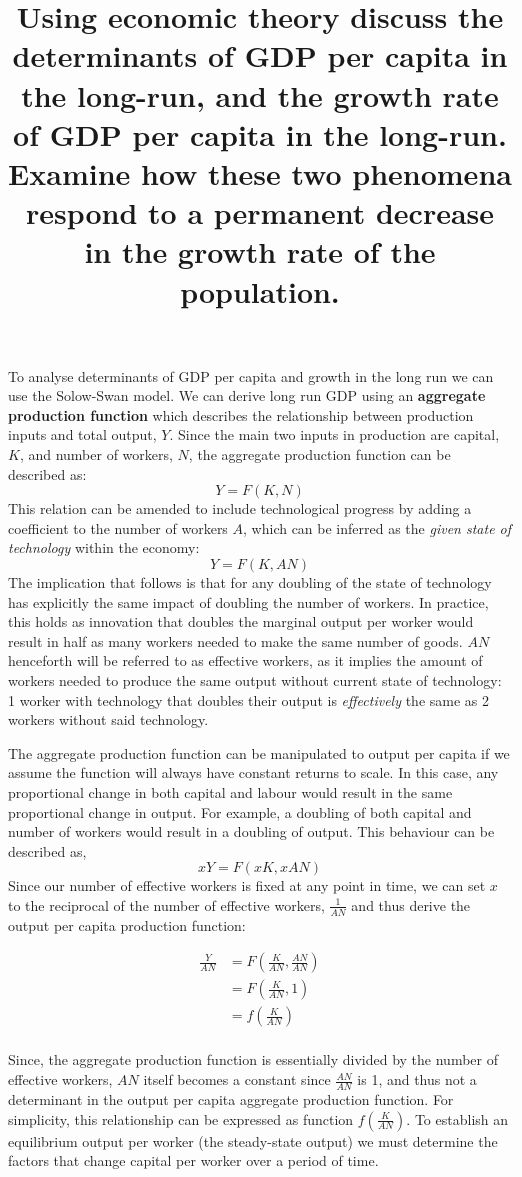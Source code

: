\documentclass[
]{article}
\title{Using economic theory discuss the determinants of GDP per capita
in the long-run, and the growth rate of GDP per capita in the long-run.
Examine how these two phenomena respond to a permanent decrease in the
growth rate of the population.}
\author{}
\date{}
\begin{document}
\maketitle

To analyse determinants of GDP per capita and growth in the long run we
can use the Solow-Swan model. We can derive long run GDP using an
\textbf{aggregate production function} which describes the relationship
between production inputs and total output, {\(Y\)}. Since the main two
inputs in production are capital, {\(K\)}, and number of workers,
{\(N\)}, the aggregate production function can be described as:
{\[Y = F(K,N)\]}This relation can be amended to include technological
progress by adding a coefficient to the number of workers {\(A\)}, which
can be inferred as the \emph{given state of technology} within the
economy: {\[Y = F(K,AN)\]}The implication that follows is that for any
doubling of the state of technology has explicitly the same impact of
doubling the number of workers. In practice, this holds as innovation
that doubles the marginal output per worker would result in half as many
workers needed to make the same number of goods. {\(AN\)} henceforth
will be referred to as effective workers, as it implies the amount of
workers needed to produce the same output without current state of
technology: 1 worker with technology that doubles their output is
\emph{effectively} the same as 2 workers without said technology.

The aggregate production function can be manipulated to output per
capita if we assume the function will always have constant returns to
scale. In this case, any proportional change in both capital and labour
would result in the same proportional change in output. For example, a
doubling of both capital and number of workers would result in a
doubling of output. This behaviour can be described as,
{\[xY = F(xK,xAN)\]}Since our number of effective workers is fixed at
any point in time, we can set {\(x\)} to the reciprocal of the number of
effective workers, {\(\frac{1}{AN}\)} and thus derive the output per
capita production function:

\[\begin{matrix}
\frac{Y}{AN} & {= F\left( \frac{K}{AN},\frac{AN}{AN} \right)} \\
 & {= F\left( \frac{K}{AN},1 \right)} \\
 & {= f\left( \frac{K}{AN} \right)} \\
\end{matrix}\]

Since, the aggregate production function is essentially divided by the
number of effective workers, {\(AN\)} itself becomes a constant since
{\(\frac{AN}{AN}\)} is 1, and thus not a determinant in the output per
capita aggregate production function. For simplicity, this relationship
can be expressed as function {\(f\left( \frac{K}{AN} \right)\)}. To
establish an equilibrium output per worker (the steady-state output) we
must determine the factors that change capital per worker over a period
of time.
\end{document}
